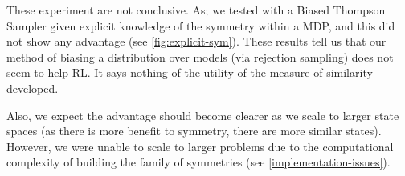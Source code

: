 

These experiment are not conclusive. As; we tested with a Biased Thompson Sampler given explicit knowledge of the symmetry within a MDP,
and this did not show any advantage (see \ref{fig:explicit-sym}). These results tell us that our method of biasing a distribution over models (via rejection sampling)
does not seem to help RL. It says nothing of the utility of the measure of similarity developed.

Also, we expect the advantage should become clearer as we scale to larger state spaces (as there is more benefit to symmetry, there are more similar states).
However, we were unable to scale to larger problems due to the computational complexity of building the family of symmetries (see \ref{implementation-issues}).
